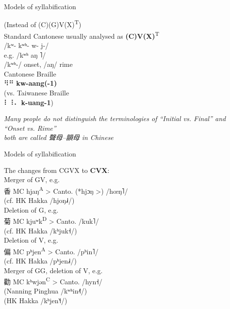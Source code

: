 \documentclass{beamer}
\newcommand{\braille}[1]{{\braillefont #1}}
\begin{document}
\begin{frame}[fragile]{Models of syllabification}

{\scriptsize (Instead of (C)(G)V(X)\textsuperscript{T})} \\
Standard Cantonese usually analysed as \textbf{(C)V(X)}\textsuperscript{T}\\
/kʷ- kʷʰ- w- j-/\\ 
\medskip
e.g. /kʷʰ aŋ ˥/\\
/kʷʰ-/ onset, /aŋ/ rime\\ 

\medskip
Cantonese Braille\\
\braille{⠻⠛} \textbf{kw-aang(-1)}\\ 
\medskip
(vs. Taiwanese Braille\\ \braille{⠇⠸⠄} \textbf{k-uang-1})
\bigskip
\begin{center}
\emph{\scriptsize Many people do not distinguish the terminologies of \enquote{Initial vs. Final} and \enquote{Onset vs. Rime} \\ both are called 聲母–韻母 in Chinese}
\end{center}

\end{frame}

\begin{frame}[fragile]{Models of syllabification}

The changes from CGVX to \textbf{CVX}:\\
Merger of GV, e.g.\\
\quad 香 MC hjaŋ\textsuperscript{A} > Canto. (*hjɔŋ >) /hœŋ˥/\\ 
\quad \quad (cf. HK Hakka /hjoŋ˩˧/)\\
\smallskip
Deletion of G, e.g.\\
\quad 菊 MC kjuʷk\textsuperscript{D} > Canto. /kuk˥/\\ 
\quad \quad (cf. HK Hakka /kʰjuk˧/)\\
\smallskip
Deletion of V, e.g.\\
\quad 偏 MC pʰjen\textsuperscript{A} > Canto. /pʰin˥/\\ 
\quad \quad (cf. HK Hakka /pʰjen˩˧/)\\
\smallskip
Merger of GG, deletion of V, e.g.\\
\quad 勸 MC kʰwjən\textsuperscript{C} > Canto. /hyn˧/\\
\quad \quad (Nanning Pinghua /kʷʰin˨˥/)\\
\quad \quad (HK Hakka /kʰjen˥˧/)\\
\end{frame}
\end{document}
